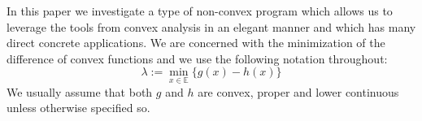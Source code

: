 \begin{comment}
	The field loosely defined as continuous optimization has had different
	stages in the last century that might appear disconnected to the
	uninitiated. In the first half properties of convex functions and sets
	are studied by Minkowski and Farkas, not obscuse mathematicians by any
	measure but optimization stays anchored to two main pillars, the
	combinatorial case which is studied in tandem with computer science
	which is at its inception and the linear case which is now a well
	established "technology" to use Boyd's terms. The rest of continuous
	optimization kept revolving around ancient ideas because of the
	constraints imposed by differentiability or smoothness, and even more
	because numerical simulations are still at their prehistorical state.
	While combinatorial optimization has some nice connections with graph
	theory which is also emerging and theoretical computer science, the
	optimization of continuous functions seems at the time like a mere
	mixture of numerical techniques, quite un-aesthetic often and doesn't
	seem to connect to other theoretical results.  The modern theory arises
	out of the works of Rockafellar and Fenchel amongst others who shifted
	the emphasis towards \emph{geometrical} concerns, explored duality that
	is the offspring in some regard's of Von Neumann's minimax theorem and
	constructed tools to approach analysis in non smooth contexts with
	subdifferentiability and in general established the grounds for
	continuous optimization to be a mathematical field in its own right.\\

It is of notable interest that Rockafellar's first book is called "Convex
Analysis" while his magnum opus published decades later adopts the title
"Variational Analysis". Now an increasing number of monographs get published
with tags such \emph{non-linear optimization} or \emph{variational problems}.
It testifies to the fact that non-linear optimization is starting to grow out
of convex analysis per-se.  Convex analysis initially provided the rigorous
foundation needed to approach problems that didn't present some of the
structures on which mathematical research had been focusing so far, linearity,
differentiability and integrability being the three major ones. It allowed to
do some nice mathematics even when both linearity and differentiability
vanished with an elegant geometrical framework. This approach can be summarized
by an important and quite simple result: every convex function can be
identified with its epigraph.\\
\end{comment}
In this paper we investigate a type of non-convex program which allows us to
leverage the tools from convex analysis in an elegant manner and which has many
direct concrete applications. We are concerned with the minimization of the
difference of convex functions and we use the following notation throughout:
\begin{equation} \lambda := \min_{x\in\mathbb E}\{ g(x)-h(x)\}\end{equation}
We usually assume that both $g$ and $h$ are convex, proper and lower 
continuous unless otherwise specified so.
